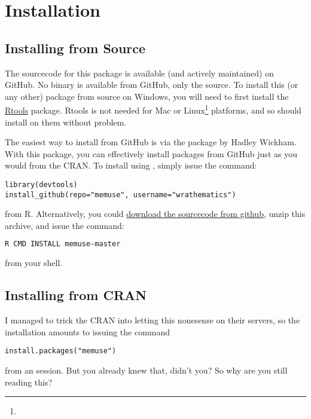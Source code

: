 \section{Installation}

\subsection{Installing from Source}

The sourcecode for this package is available (and actively maintained) on 
GitHub.  No binary is available from GitHub, only the source.  To install this 
(or any other) package from source on Windows, you will need to first install 
the \href{http://cran.r-project.org/bin/windows/Rtools/Rtools216.exe}{Rtools} 
package.  Rtools is not needed for Mac or Linux\footnote{\interject} 
platforms, and so  should install on them without problem.

The easiest way to install  from GitHub is via the \href{http://cran.r-project.org/web/packages/devtools/index.html}{} package by Hadley Wickham.  With this package, you can effectively install packages from GitHub just as you would from the CRAN.  To install  using , simply issue the command:
\begin{lstlisting}[language=rr]
library(devtools)
install_github(repo="memuse", username="wrathematics")
\end{lstlisting}
from R.  Alternatively, you could  
\href{https://github.com/wrathematics/memuse/archive/master.zip}{download the 
sourcecode from github}, unzip this archive, and issue the command:
\begin{lstlisting}[language=sh]
R CMD INSTALL memuse-master
\end{lstlisting}
from your shell.


\subsection{Installing from CRAN}

I managed to trick the CRAN into letting this nonesense on their servers, 
so the installation amounts to issuing the command
\begin{lstlisting}[language=rr]
install.packages("memuse")
\end{lstlisting}
from an  session.  But you already knew that, didn't you?  So why are you still reading this?